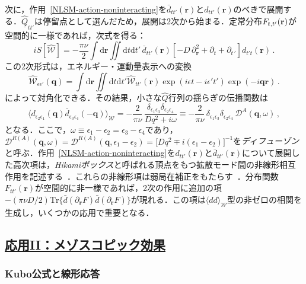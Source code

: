 \documentclass[a4paper,11pt]{ltjsarticle}
\newcommand{\subsectionlink}[1]{\subsection[#1]{\hyperlink{toc}{#1}}}
\def\Tr{\mathrm{Tr}}
\def\d{\mathrm{d}}
\begin{document}
次に，作用~\eqref{NLSM-action-noninteracting}を$\bar{d}_{tt'}(\mathbf{r})$と$d_{tt'}(\mathbf{r})$のべきで展開する．$\underline{\hat{Q}}_{tt'}$は停留点として選んだため，展開は2次から始まる．定常分布$F_{t,t'}({\bf r})$が空間的に一様であれば，次式を得る：
\begin{equation}\label{NLSM-S-W}
iS[\hat{\mathcal{W}}]=-\frac{\pi\nu}{2}\int\d\mathbf{r} \iint\d t\d t'\,
\bar{d}_{tt'}(\mathbf{r})
\left[-D\,\partial^{2}_{\mathbf{r}}+\partial_{t}+\partial_{t\,'}\right]
d_{t't}(\mathbf{r})\,.
\end{equation}
この2次形式は，エネルギー・運動量表示への変換
$$\hat{\mathcal{W}}_{\epsilon\epsilon'}(\mathbf{q})=\int\d\mathbf{r}
\iint\d t\d t'\hat{\mathcal{W}}_{tt'}(\mathbf{r})\exp(i\epsilon
t-i\epsilon't')\exp(-i\mathbf{qr})\,.$$
によって対角化できる．その結果，小さな$\hat Q$行列の揺らぎの伝播関数は
\begin{equation}\label{NLSM-d-d}
\langle d_{\epsilon_{2}\epsilon_{1}}(\mathbf{q})
\bar{d}_{\epsilon_{3}\epsilon_{4}}(-\mathbf{q})\rangle_{\mathcal{W}}=
-\frac{2}{\pi\nu}\,\frac{\delta_{\epsilon_{1}\epsilon_{3}}\delta_{\epsilon_{2}\epsilon_{4}}}
{Dq^2+i\omega}\equiv -\frac{2}{\pi\nu}\,
\delta_{\epsilon_{1}\epsilon_{3}}\delta_{\epsilon_{2}\epsilon_{4}}\,
\mathcal{D}^A(\mathbf{q},\omega)\,,
\end{equation}
となる．ここで，$\omega\equiv\epsilon_{1}-\epsilon_{2}=\epsilon_3-\epsilon_4$であり，$\mathcal{D}^{R(A)}(\mathbf{q},\omega)=\mathcal{D}^{R(A)}(\mathbf{q},\epsilon_{1}-\epsilon_{2})=
\big[Dq^{2}\mp i(\epsilon_{1}-\epsilon_{2})\big]^{-1}$を{\em ディフューゾン}と呼ぶ．作用~\eqref{NLSM-action-noninteracting}を$d_{tt'}(\mathbf{r})$と$\bar{d}_{tt'}(\mathbf{r})$について展開した高次項は，{\em Hikamiボックス}と呼ばれる頂点をもつ拡散モード間の非線形相互作用を記述する~\cite{Hikami,Gor'kovLarkinKhmelnitskii}．これらの非線形項は弱局在補正をもたらす~\cite{Gor'kovLarkinKhmelnitskii,AAKL,LeeRamakrishnan,ALW-book}．分布関数$F_{tt'}(\mathbf{r})$が空間的に非一様であれば，2次の作用に追加の項$-(\pi\nu D/2)\Tr\big\{\bar{d}(\partial_{\mathbf{r}}
F)\bar{d}(\partial_{\mathbf{r}} F)\big\}$が現れる．この項は$\langle
dd\rangle_{\mathcal{W}}$型の非ゼロの相関を生成し，いくつかの応用で重要となる．




\subsectionlink{応用II：メゾスコピック効果}\label{app_Part-II}
\subsubsection{Kubo公式と線形応答}\label{app_Part-II-1}
\end{document}
